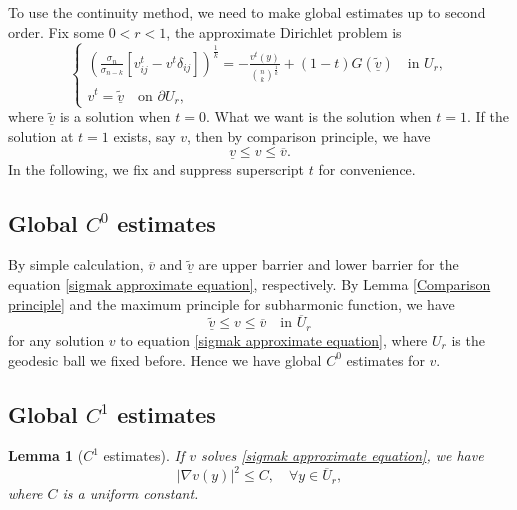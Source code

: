 \documentclass[reqno]{amsart}
\newtheorem{lemma}[theorem]{Lemma}
\theoremstyle{remark}
\theoremstyle{definition}
\numberwithin{equation}{section}
\begin{document}
To use the continuity method, we need to make global estimates up to second order. Fix some $0<r<1$, the approximate Dirichlet problem is 
\begin{equation}
    \begin{cases} 
       \left( \frac{\sigma_n}{\sigma_{n-k}} \left[v^t_{ij}-v^t\delta_{ij}\right] \right)^{\frac{1}{k}} = -\frac{v^t(y)}{\binom{n}{k}^{\frac{1}{k}}} + (1-t)G(\tilde{\underline{v}}) \quad \text{in } U_r, \\
       v^t = \tilde{\underline{v}} \quad \text{on } \partial U_r,
       \label{sigmak approximate equation}
    \end{cases}
\end{equation}
where $\tilde{\underline{v}}$ is a solution when $t=0$. What we want is the solution when $t=1$. If the solution at $t=1$ exists, say $v$, then by comparison principle, we have
\[
\underline{v} \leqslant v \leqslant \overline{v}. 
\]
In the following, we fix and suppress superscript $t$ for convenience. 


\subsection{Global \texorpdfstring{$C^0$}{C0} estimates}

By simple calculation, $\overline{v}$ and $\tilde{\underline{v}}$ are upper barrier and lower barrier for the equation \eqref{sigmak approximate equation}, respectively. By Lemma \ref{Comparison principle} and the maximum principle for subharmonic function, we have
\[
\tilde{\underline{v}} \leqslant v \leqslant \overline{v} \quad \text{in } \overline{U}_r
\]
for any solution $v$ to equation \eqref{sigmak approximate equation}, where $U_r$ is the geodesic ball we fixed before. Hence we have global $C^0$ estimates for $v$.


\subsection{Global \texorpdfstring{$C^1$}{C1} estimates}

\begin{lemma}[$C^1$ estimates]\label{C1estimates}
    If $v$ solves \eqref{sigmak approximate equation}, we have
    \[
    |\nabla v(y)|^2 \leqslant C, \quad \forall y \in \overline{U}_r,
    \]
    where $C$ is a uniform constant. 
\end{lemma}
\end{document}
